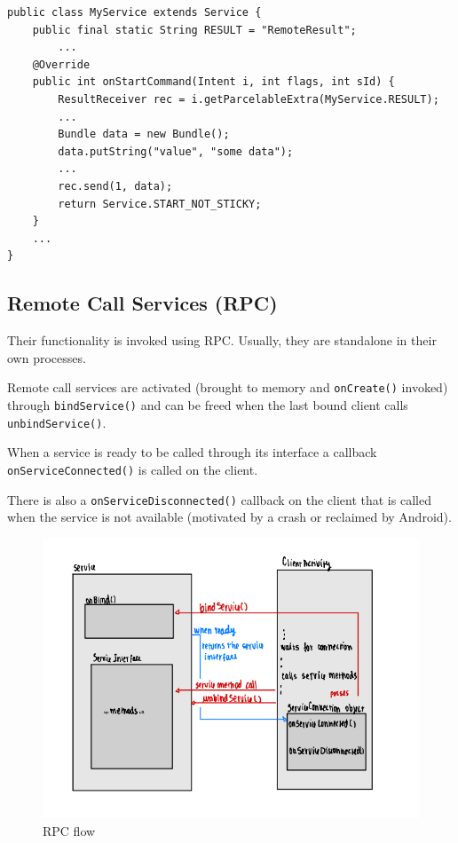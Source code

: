 \begin{lstlisting}[title=A service sending results]
public class MyService extends Service {
    public final static String RESULT = "RemoteResult";
        ...
    @Override
    public int onStartCommand(Intent i, int flags, int sId) {
        ResultReceiver rec = i.getParcelableExtra(MyService.RESULT);
        ...
        Bundle data = new Bundle();
        data.putString("value", "some data");
        ...
        rec.send(1, data);
        return Service.START_NOT_STICKY;
    }
    ...
}
\end{lstlisting}


\subsection{Remote Call Services (RPC)}

Their functionality is invoked using RPC. Usually, they are standalone in their own processes. 

Remote call services are activated (brought to memory and \texttt{onCreate()} invoked) through
\texttt{bindService()} and can be freed when the last bound client calls \texttt{unbindService()}.

When a service is ready to be called through its interface a callback  \texttt{onServiceConnected()} is 
called on the client.

There is also a \texttt{onServiceDisconnected()} callback on the client that is called when the 
service is not available (motivated by a crash or reclaimed by Android). 

\begin{figure}[h]
\centering
\includegraphics[width=1\linewidth]{figures/06_RPC_flow.png}
\caption{RPC flow}
\label{fig:rpc_flow}
\end{figure}


